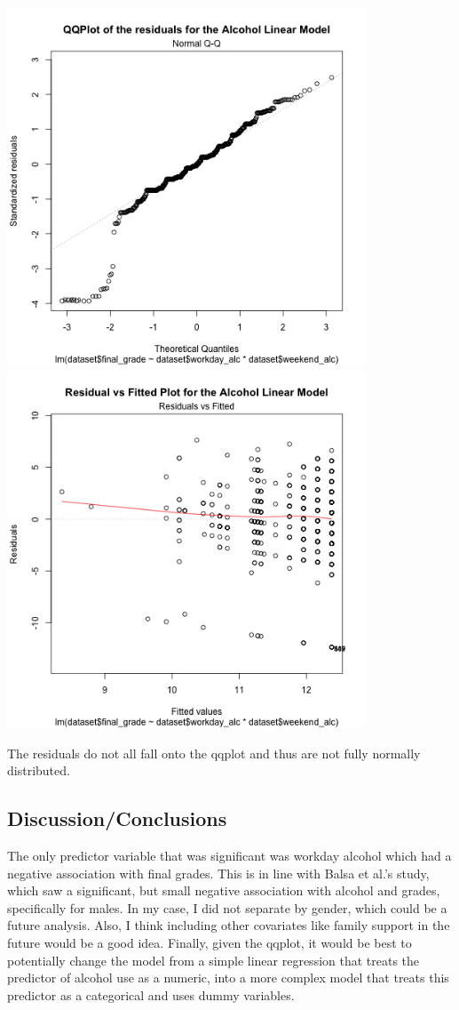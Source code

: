 \documentclass[]{article}
\begin{document}
\includegraphics[width=0.8\textwidth,height=\textheight]{images/residual_plot_qq.png}~\includegraphics[width=0.8\textwidth,height=\textheight]{images/residual_fitted_plot.png}

The residuals do not all fall onto the qqplot and thus are not fully
normally distributed.

\hypertarget{discussionconclusions}{%
\subsection{Discussion/Conclusions}\label{discussionconclusions}}

The only predictor variable that was significant was workday alcohol
which had a negative association with final grades. This is in line with
Balsa et al.'s study, which saw a significant, but small negative
association with alcohol and grades, specifically for males. In my case,
I did not separate by gender, which could be a future analysis. Also, I
think including other covariates like family support in the future would
be a good idea. Finally, given the qqplot, it would be best to
potentially change the model from a simple linear regression that treats
the predictor of alcohol use as a numeric, into a more complex model
that treats this predictor as a categorical and uses dummy variables.
\end{document}
